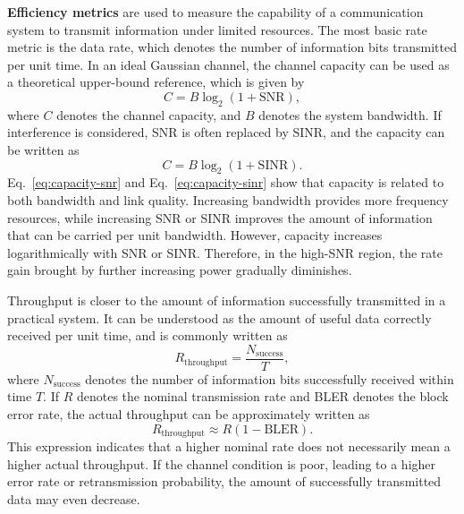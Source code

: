 \textbf{Efficiency metrics} are used to measure the capability of a communication system
to transmit information under limited resources.
The most basic rate metric is the data rate,
which denotes the number of information bits transmitted per unit time.
In an ideal Gaussian channel,
the channel capacity can be used as a theoretical upper-bound reference,
which is given by
\begin{equation}
    C
    =
    B \log_2
    \left(
        1+\mathrm{SNR}
    \right),
    \label{eq:capacity-snr}
\end{equation}
where
\(C\) denotes the channel capacity,
and \(B\) denotes the system bandwidth.
If interference is considered,
SNR is often replaced by SINR,
and the capacity can be written as
\begin{equation}
    C
    =
    B \log_2
    \left(
        1+\mathrm{SINR}
    \right).
    \label{eq:capacity-sinr}
\end{equation}
Eq.~\eqref{eq:capacity-snr} and Eq.~\eqref{eq:capacity-sinr} show that capacity is related to both bandwidth
and link quality.
Increasing bandwidth provides more frequency resources,
while increasing SNR or SINR improves the amount of information that can be carried per unit bandwidth.
However,
capacity increases logarithmically with SNR or SINR.
Therefore,
in the high-SNR region,
the rate gain brought by further increasing power gradually diminishes.

Throughput is closer to the amount of information successfully transmitted in a practical system.
It can be understood as the amount of useful data correctly received per unit time,
and is commonly written as
\begin{equation}
    R_{\mathrm{throughput}}
    =
    \frac{N_{\mathrm{success}}}{T},
    \label{eq:throughput-definition}
\end{equation}
where
\(N_{\mathrm{success}}\) denotes the number of information bits successfully received within time \(T\).
If \(R\) denotes the nominal transmission rate
and BLER denotes the block error rate,
the actual throughput can be approximately written as
\begin{equation}
    R_{\mathrm{throughput}}
    \approx
    R
    \left(
        1-\mathrm{BLER}
    \right).
    \label{eq:throughput-bler}
\end{equation}
This expression indicates that a higher nominal rate does not necessarily mean a higher actual throughput.
If the channel condition is poor,
leading to a higher error rate or retransmission probability,
the amount of successfully transmitted data may even decrease.

